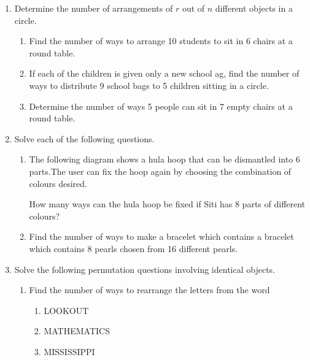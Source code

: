 \documentclass{report}
\begin{document}
\begin{multicols*}{2}
\begin{enumerate}
            \item Determine the number of arrangements of $r$ out of $n$ different objects in a
                  circle.
                  \begin{enumerate}
                        \item Find the number of ways to arrange 10 students to sit in 6 chairs at a round
                              table.
                        \item If each of the children is given only a new school ag, find the number of ways
                              to distribute 9 school bags to 5 children sitting in a circle.
                        \item Determine the number of ways 5 people can sit in 7 empty chairs at a round
                              table.
                  \end{enumerate}

            \item Solve each of the following questions.
                  \begin{enumerate}
                        \item The following diagram shows a hula hoop that can be dismantled into 6 parts.The
                              user can fix the hoop again by choosing the combination of colours desired.

                              How many ways can the hula hoop be fixed if Siti has 8 parts of different
                              colours?

                        \item Find the number of ways to make a bracelet which contains a bracelet which
                              contains 8 pearls chosen from 16 different pearls.
                  \end{enumerate}

            \item Solve the following permutation questions involving identical objects.
                  \begin{enumerate}
                        \item Find the number of ways to rearrange the letters from the word
                              \begin{enumerate}
                                    \item LOOKOUT
                                    \item MATHEMATICS
                                    \item MISSISSIPPI
                              \end{enumerate}


\end{enumerate}
\end{enumerate}
\end{multicols*}
\end{document}

